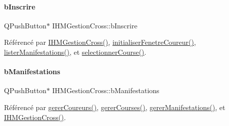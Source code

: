 \mbox{\label{class_i_h_m_gestion_cross_a1afbc04ebd42deafebbbdc998d0fc246}} 
\paragraph{\texorpdfstring{b\+Inscrire}{bInscrire}}
{\footnotesize\ttfamily Q\+Push\+Button$\ast$ I\+H\+M\+Gestion\+Cross\+::b\+Inscrire\hspace{0.3cm}{\ttfamily [private]}}



Référencé par \hyperlink{class_i_h_m_gestion_cross_a2c62fd83326a87456a403f46acc408c8}{I\+H\+M\+Gestion\+Cross()}, \hyperlink{class_i_h_m_gestion_cross_aa5d9de499a66e52b843c4ef4c6074a60}{initialiser\+Fenetre\+Coureur()}, \hyperlink{class_i_h_m_gestion_cross_a0eadd8592c966c89bf7b5a25a0ae7589}{lister\+Manifestations()}, et \hyperlink{class_i_h_m_gestion_cross_ae555b32462455a2cdaf0f8dc2e016d14}{selectionner\+Course()}.

\mbox{\label{class_i_h_m_gestion_cross_a540b4525e546b6d61988245ae53768ce}} 
\paragraph{\texorpdfstring{b\+Manifestations}{bManifestations}}
{\footnotesize\ttfamily Q\+Push\+Button$\ast$ I\+H\+M\+Gestion\+Cross\+::b\+Manifestations\hspace{0.3cm}{\ttfamily [private]}}



Référencé par \hyperlink{class_i_h_m_gestion_cross_ad46a2295500cf98dbc18f862f6020103}{gerer\+Coureurs()}, \hyperlink{class_i_h_m_gestion_cross_a82e3861f4959d3599d1d85ee0b3b8654}{gerer\+Courses()}, \hyperlink{class_i_h_m_gestion_cross_a406efb83dac8a8ac5d04e9b8cbeaf316}{gerer\+Manifestations()}, et \hyperlink{class_i_h_m_gestion_cross_a2c62fd83326a87456a403f46acc408c8}{I\+H\+M\+Gestion\+Cross()}.

\mbox{\label{class_i_h_m_gestion_cross_a60cdc44c61bcd4e1e189c8de5556b89e}} 
